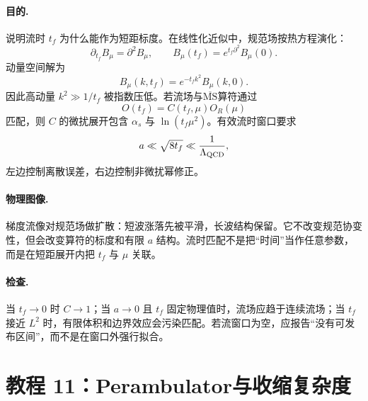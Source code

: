 \documentclass[UTF8,12pt,a4paper,twoside,openany]{ctexbook}
\newcommand{\MSbar}{\overline{\mathrm{MS}}}
\begin{document}
\paragraph{目的.} 说明流时 \(t_f\) 为什么能作为短距标度。在线性化近似中，规范场按热方程演化：
\begin{equation}
  \partial_{t_f}B_\mu=\partial^2B_\mu,
  \qquad
  B_\mu(t_f)=e^{t_f\partial^2}B_\mu(0).
  \label{eq:tutorial-flow-heat}
\end{equation}
动量空间解为
\begin{equation}
  B_\mu(k,t_f)=e^{-t_fk^2}B_\mu(k,0).
  \label{eq:tutorial-flow-momentum}
\end{equation}
因此高动量 \(k^2\gg1/t_f\) 被指数压低。若流场与\(\MSbar\)算符通过
\begin{equation}
  O(t_f)=C(t_f,\mu)O_R(\mu)
  \label{eq:tutorial-flow-matching}
\end{equation}
匹配，则 \(C\) 的微扰展开包含 \(\alpha_s\) 与 \(\ln(t_f\mu^2)\)。有效流时窗口要求
\begin{equation}
  a\ll\sqrt{8t_f}\ll\frac1{\Lambda_{\rm QCD}},
  \label{eq:tutorial-flow-window}
\end{equation}
左边控制离散误差，右边控制非微扰幂修正。

\paragraph{物理图像.} 梯度流像对规范场做扩散：短波涨落先被平滑，长波结构保留。它不改变规范协变性，但会改变算符的标度和有限 \(a\) 结构。流时匹配不是把“时间”当作任意参数，而是在短距展开内把 \(t_f\) 与 \(\mu\) 关联。

\paragraph{检查.} 当 \(t_f\to0\) 时 \(C\to1\)；当 \(a\to0\) 且 \(t_f\) 固定物理值时，流场应趋于连续流场；当 \(t_f\) 接近 \(L^2\) 时，有限体积和边界效应会污染匹配。若流窗口为空，应报告“没有可发布区间”，而不是在窗口外强行拟合。

\section{教程 11：Perambulator与收缩复杂度}
\end{document}
